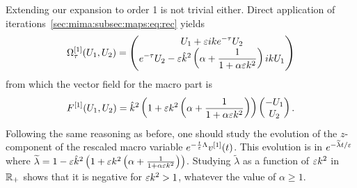 %

Extending our expansion to order 1 is not trivial either. 
Direct application of iterations~\eqref{sec:mima:subsec:maps:eq:rec} yields 
$$
\Omega^{[1]}_{\tau}(U_1, U_2) = \begin{pmatrix}  \displaystyle
U_1 + \varepsilon ik e^{-\tau} U_2 
 \\  \displaystyle 
e^{-\tau}U_2 - \varepsilon \hat{k}^2 \left( \alpha + \frac{1}{1 + \alpha \varepsilon k^2} \right) ik U_1 
 \end{pmatrix} 
$$
from which the vector field for the macro part is 
$$
F^{[1]}(U_1, U_2) = \hat{k}^2 \left( 1 + \varepsilon k^2 \left( \alpha + \frac{1}{1 + \alpha \varepsilon k^2} \right) \right) 
\begin{pmatrix} -U_1 \\ U_2 \end{pmatrix} .
$$
Following the same reasoning as before, one should study 
the evolution of the $z$-component of the rescaled macro variable $e^{-\frac{t}{\varepsilon}\Lambda}v^{[1]}(t)$. 
This evolution is in $e^{-\widetilde{\lambda}t/\varepsilon}$ 
where $\widetilde{\lambda} = 1 - \varepsilon \hat{k}^2 \left( 1 + \varepsilon k^2 \left( \alpha + \frac{1}{1 + \alpha \varepsilon k^2} \right) \right)$. 
Studying $\widetilde{\lambda}$ as a function of $\varepsilon k^2$ in $\mathbb{R}_+$ shows that 
it is negative for $\varepsilon k^2 > 1$, whatever the value of $\alpha \geq 1$. 

